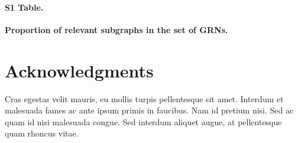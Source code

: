 \documentclass[10pt,letterpaper]{article}
\begin{document}
\paragraph*{S1 Table.}
\label{S1_Table}
{\bf Proportion of relevant subgraphs in the set of GRNs.}

\section*{Acknowledgments}
Cras egestas velit mauris, eu mollis turpis pellentesque sit amet. Interdum et malesuada fames ac ante ipsum primis in faucibus. Nam id pretium nisi. Sed ac quam id nisi malesuada congue. Sed interdum aliquet augue, at pellentesque quam rhoncus vitae.

\nolinenumbers

%
%
% 
% 
% 
% 
% 

{}
\end{document}

